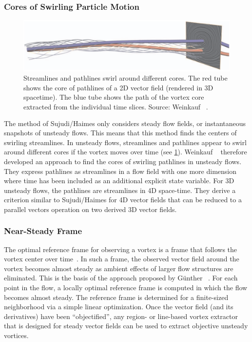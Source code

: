 \subsubsection{Cores of Swirling Particle Motion} %
\label{ssub:cores_of_swirling_particle_motion}
%
\begin{figure}[t]
    \centering
    \includegraphics[width=\textwidth]{figures/pathline_streamline_core.png}
    \caption{Streamlines and pathlines swirl around different cores. The red
    tube shows the core of pathlines of a \ac{2D} vector field (rendered in
    \ac{3D} spacetime). The blue tube shows the path of the vortex core
    extracted from the individual time slices. Source: Weinkauf
    \etal{}~\cite{Weinkauf2007}.}
    \label{fig:cores_of_swirling_particle_motion}
\end{figure}%
%
The method of Sujudi/Haimes only considers steady flow fields, or instantaneous
snapshots of unsteady flows.
%
This means that this method finds the centers of swirling streamlines.
%
In unsteady flows, streamlines and pathlines appear to swirl around different
cores if the vortex moves over time (see
\cref{fig:cores_of_swirling_particle_motion}).
%
Weinkauf \etal{}~\cite{Weinkauf2007} therefore developed an approach to find the
cores of swirling pathlines in unsteady flows.
%
They express pathlines as streamlines in a flow field with one more dimension
where time has been included as an additional explicit state variable.
%
For \ac{3D} unsteady flows, the pathlines are streamlines in \ac{4D} space-time.
%
They derive a criterion similar to Sujudi/Haimes for \ac{4D} vector fields that
can be reduced to a parallel vectors operation on two derived \ac{3D} vector
fields.
%
%
\subsubsection{Near-Steady Frame} %
\label{ssub:near_steady_frame}
%
The optimal reference frame for observing a vortex is a frame that follows the
vortex center over time~\cite{Robinson1991}.
%
In such a frame, the observed vector field around the vortex becomes almost
steady as ambient effects of larger flow structures are eliminated.
%
This is the basis of the approach proposed by G\"unther
\etal{}~\cite{Guenther2017}.
%
For each point in the flow, a locally optimal reference frame is computed in
which the flow becomes almost steady.
%
The reference frame is determined for a finite-sized neighborhood via a simple
linear optimization.
%
Once the vector field (and its derivatives) have been ``objectified'', any
region- or line-based vortex extractor that is designed for steady vector fields
can be used to extract objective unsteady vortices.
%
%
%
